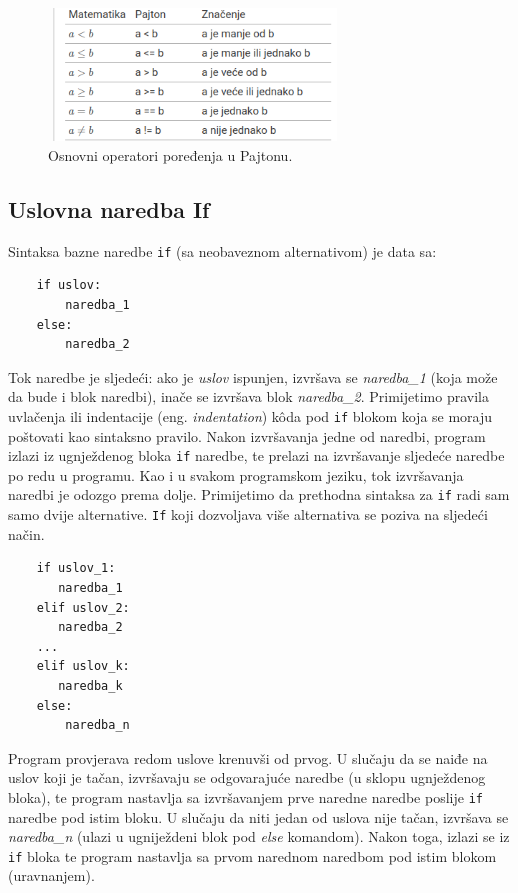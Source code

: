 \begin{figure}[H]
	\centering
	\includegraphics[width=220pt,height=100pt]{slike/operatori_poredjenja.png}
	\caption{Osnovni operatori poređenja u Pajtonu.}
	\label{fig: operatori_poredjenja}
\end{figure}

\subsection{Uslovna naredba If}

Sintaksa bazne naredbe \texttt{if} (sa neobaveznom alternativom) je data sa:
\begin{verbatim}
    if uslov:
        naredba_1
    else:
        naredba_2
\end{verbatim}

Tok naredbe je sljedeći: ako je \emph{uslov} ispunjen, izvršava se \textit{naredba\_1} (koja može da bude i blok naredbi), inače se izvršava blok \textit{naredba\_2}. Primijetimo pravila uvlačenja ili indentacije (eng. \textit{indentation}) k\^oda pod \texttt{if} blokom koja se moraju poštovati kao sintaksno pravilo. Nakon izvršavanja jedne od naredbi, program izlazi iz ugnježdenog bloka \texttt{if} naredbe, te prelazi na izvršavanje sljedeće naredbe po redu u programu. Kao i u svakom programskom jeziku, tok izvršavanja naredbi je  odozgo prema dolje. Primijetimo da prethodna sintaksa za \texttt{if} radi sam samo dvije alternative. \texttt{If} koji dozvoljava više alternativa se poziva na sljedeći način. 

 \begin{verbatim}
 	if uslov_1:
 	   naredba_1
 	elif uslov_2:
 	   naredba_2
 	...
 	elif uslov_k:
 	   naredba_k
 	else:
 	    naredba_n
 \end{verbatim}

Program provjerava redom uslove krenuvši od prvog. U slučaju da se naiđe na  uslov koji je tačan, izvršavaju se odgovarajuće naredbe (u sklopu ugnježdenog  bloka), te program  nastavlja sa izvršavanjem prve naredne naredbe poslije \texttt{if} naredbe pod istim bloku. U slučaju da niti jedan od uslova nije tačan, izvršava se \emph{naredba\_n} (ulazi u ugniježdeni blok pod \textit{else} komandom). Nakon toga, izlazi se iz \texttt{if} bloka te program nastavlja sa prvom narednom naredbom pod istim blokom (uravnanjem).  

